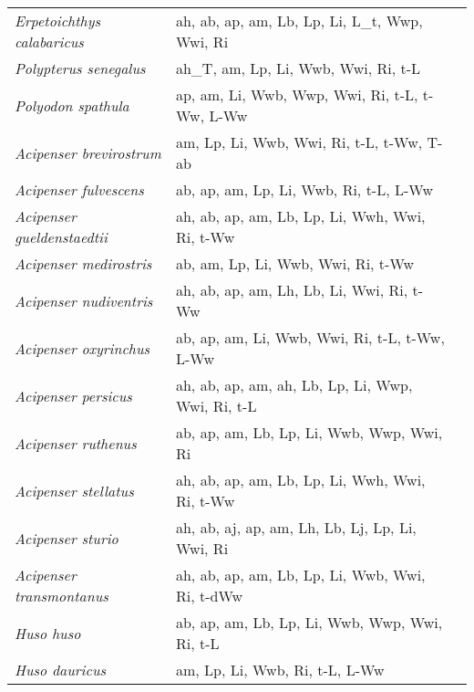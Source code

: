 {\begin{longtable}[c]{p{3.5cm}p{5.5cm}p{5.5cm}}
\emph{Erpetoichthys calabaricus} &  ah, ab, ap, am, Lb, Lp, Li, L\_t, Wwp, Wwi, Ri & \citet{Baba2011} \\
\emph{Polypterus senegalus} &  ah\_T, am, Lp, Li, Wwb, Wwi, Ri, t-L & \citet{BartGemb1997} \\
\emph{Polyodon spathula} &  ap, am, Li, Wwb, Wwp, Wwi, Ri, t-L, t-Ww, L-Ww & \citet{Rose1976} \\
\emph{Acipenser brevirostrum} &  am, Lp, Li, Wwb, Wwi, Ri, t-L, t-Ww, T-ab & \citet{Wood2005,HardLitv2004} \\
\emph{Acipenser fulvescens} &  ab, ap, am, Lp, Li, Wwb, Ri, t-L, L-Ww & \citet{Haug1969,BrucMill2006} \\
\emph{Acipenser gueldenstaedtii} &  ah, ab, ap, am, Lb, Lp, Li, Wwh, Wwi, Ri, t-Ww & \citet{MemiErca2009,Birs1993,Coad2018,MikhElen2013,NazaPour2013,SiddCoss2014} \\
\emph{Acipenser medirostris} &  ab, am, Lp, Li, Wwb, Wwi, Ri, t-Ww & \citet{MoseIsra2016} \\
\emph{Acipenser nudiventris} &  ah, ab, ap, am, Lh, Lb, Li, Wwi, Ri, t-Ww & \citet{MikhElen2013,KottFrey2007,Coad2018,SiddCoss2014,MousGhaf2014,RochWill1991,Iran2017} \\
\emph{Acipenser oxyrinchus} &  ab, ap, am, Li, Wwb, Wwi, Ri, t-L, t-Ww, L-Ww & \citet{MimsLazu2002,MasoClug1992} \\
\emph{Acipenser persicus} &  ah, ab, ap, am, ah, Lb, Lp, Li, Wwp, Wwi, Ri, t-L & \citet{ImanFala2017,KottFrey2007,Coad2018,NazaPour2013,AlavKara2005,VecsArty2001,SiddCoss2014} \\
\emph{Acipenser ruthenus} &  ab, ap, am, Lb, Lp, Li, Wwb, Wwp, Wwi, Ri & \citet{RochWill1991,Rein2002,PeteVecs2006,PikiDoek2005} \\
\emph{Acipenser stellatus} &  ah, ab, ap, am, Lb, Lp, Li, Wwh, Wwi, Ri, t-Ww & \citet{GhasNoor2018,KottFrey2007,Coad2018,MikhElen2013,Birs1993,MousGhaf2014,Frim1995,SiddCoss2014} \\
\emph{Acipenser sturio} &  ah, ab, aj, ap, am, Lh, Lb, Lj, Lp, Li, Wwi, Ri & \citet{Ehre1894,DettGins1993,Kinz1987,Bruc2008,WillRoch2009} \\
\emph{Acipenser transmontanus} &  ah, ab, ap, am, Lb, Lp, Li, Wwb, Wwi, Ri, t-dWw & \citet{ParsKofo2013,CherClar1982,LeeSonm2017} \\
\emph{Huso huso} &  ab, ap, am, Lb, Lp, Li, Wwb, Wwp, Wwi, Ri, t-L & \citet{SiddCoss2014,KottFrey2007,Coad2018,MikhElen2013,Birs1993,FalaAkha2013,Tagh2001} \\
\emph{Huso dauricus} &  am, Lp, Li, Wwb, Ri, t-L, L-Ww & \citet{BirsWald2002,KoshMikh2014} \\

\end{longtable}}
